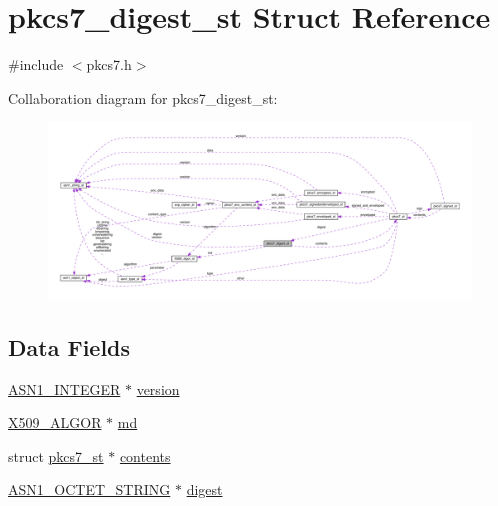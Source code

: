 \hypertarget{structpkcs7__digest__st}{}\section{pkcs7\+\_\+digest\+\_\+st Struct Reference}
\label{structpkcs7__digest__st}


{\ttfamily \#include $<$pkcs7.\+h$>$}



Collaboration diagram for pkcs7\+\_\+digest\+\_\+st\+:\nopagebreak
\begin{figure}[H]
\begin{center}
\leavevmode
\includegraphics[width=350pt]{structpkcs7__digest__st__coll__graph}
\end{center}
\end{figure}
\subsection*{Data Fields}
\begin{DoxyCompactItemize}
\item 
\hyperlink{crypto_2ossl__typ_8h_af4335399bf9774cb410a5e93de65998b}{A\+S\+N1\+\_\+\+I\+N\+T\+E\+G\+ER} $\ast$ \hyperlink{structpkcs7__digest__st_abf367aeef355b6acf5be7c569c4b28b0}{version}
\item 
\hyperlink{crypto_2ossl__typ_8h_aa2b6185e6254f36f709cd6577fb5022e}{X509\+\_\+\+A\+L\+G\+OR} $\ast$ \hyperlink{structpkcs7__digest__st_a8340dae2b5df8412e96bd4a25c48e1f5}{md}
\item 
struct \hyperlink{structpkcs7__st}{pkcs7\+\_\+st} $\ast$ \hyperlink{structpkcs7__digest__st_aeef95972194d66973936592656c73700}{contents}
\item 
\hyperlink{crypto_2ossl__typ_8h_afbd05e94e0f0430a2b729473efec88c1}{A\+S\+N1\+\_\+\+O\+C\+T\+E\+T\+\_\+\+S\+T\+R\+I\+NG} $\ast$ \hyperlink{structpkcs7__digest__st_ac51bfebf9ca26f5d9cb1f71701a25024}{digest}
\end{DoxyCompactItemize}


